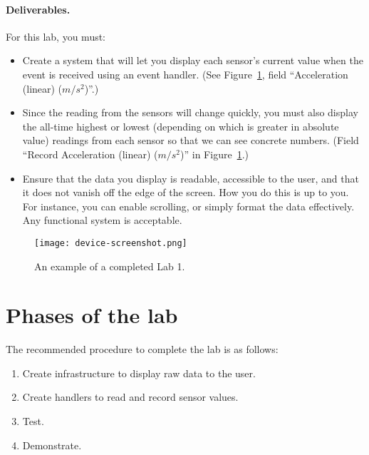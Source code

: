 \documentclass[10pt]{article}
\newcommand{\todo}[1]{{\red\textbf{TODO: }#1}\xspace}
\begin{document}
\paragraph{Deliverables.} For this lab, you must:
\begin{itemize}
\item Create a system that will let you display each sensor's current value when the event is received using an event handler. (See Figure~\ref{fig:device-screenshot}, field ``Acceleration (linear) ($m/s^2$)''.)
\item Since the reading from the sensors will change quickly, you must also display the all-time highest or lowest (depending on which is greater in absolute value) readings from each sensor so that we can see concrete numbers. (Field ``Record Acceleration (linear) ($m/s^2$)'' in Figure~\ref{fig:device-screenshot}.)
\item Ensure that the data you display is readable, accessible to the user, and that it does not vanish off the edge of the screen. How you do this is up to you. For instance, you can enable scrolling, or simply format the data effectively. Any functional system is acceptable.
\end{itemize}
\begin{figure}[htbp]
\begin{center}
\texttt{[image: device-screenshot.png]}
\end{center}
\caption{\label{fig:device-screenshot}An example of a completed Lab 1.}
\end{figure}
\section{Phases of the lab}
The recommended procedure to complete the lab is as follows:
\begin{enumerate}
\item Create infrastructure to display raw data to the user.
\item Create handlers to read and record sensor values.
\item Test.
\item Demonstrate.
\end{enumerate}
\end{document}
